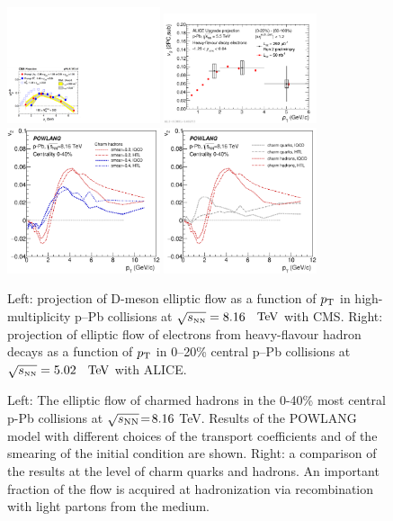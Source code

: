 \begin{figure}[ht]
\centering
\includegraphics[width=0.4\textwidth]{hf/figures/CMS_Dv2.pdf}
\includegraphics[width=0.4\textwidth]{hf/figures/2017-Oct-30-HFev2Plot.pdf}
\includegraphics[width=0.4\textwidth]{hf/figures/v2cD_pPb8TeV_smear.eps}
\includegraphics[width=0.4\textwidth]{hf/figures/v2cD_pPb8TeV_HTLvslQCD.eps}
\caption{
Left: The elliptic flow of charmed hadrons in the 0-40\% most central p-Pb collisions at $\sqrt{s_{\rm NN}}\!=\!8.16$ TeV. Results of the POWLANG model with different choices of the transport coefficients and of the smearing of the initial condition are shown. 
Right: a comparison of the results at the level of charm quarks and hadrons. An important fraction of the flow is acquired at hadronization via recombination with light partons from the medium.}
Left: projection of D-meson elliptic flow as a function of $p_{\rm T}$ in high-multiplicity p--Pb collisions at $\sqrt{s_{\scriptscriptstyle \rm NN}}=8.16$~$~\text{TeV}$ with CMS.
Right: projection of elliptic flow of electrons from heavy-flavour hadron decays as a function of $p_{\rm T}$ in 0--20\% central p--Pb collisions at $\sqrt{s_{\scriptscriptstyle \rm NN}}=5.02$~$~\text{TeV}$ with ALICE.
\label{fig:POWLANG-small2}
\end{figure}
